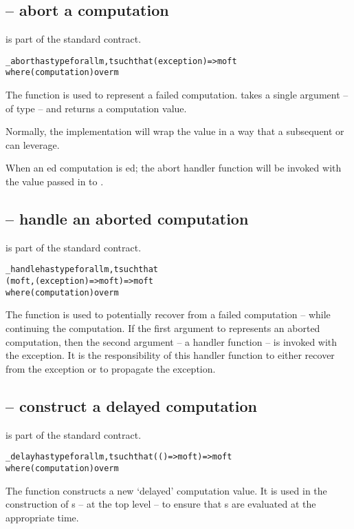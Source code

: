 \subsection{ -- abort a computation}
\label{abortFunction}
 is part of the standard  contract.
\begin{alltt}
\_abort has type for all m,t such that (exception)=>m of t
                 where (computation) over m
\end{alltt}

The  function is used to represent a failed computation.  takes a single argument -- of type  -- and returns a computation value.

\begin{aside}
Normally, the  implementation will wrap the  value in a way that a subsequent  or  can leverage.
\end{aside}

When an ed computation is ed; the abort handler function will be  invoked with the value passed in to .

\subsection{ -- handle an aborted computation}
\label{handleFunction}
 is part of the standard  contract.
\begin{alltt}
\_handle has type for all m,t such that 
                  (m of t, (exception)=>m of t) => m of t
                  where (computation) over m
\end{alltt}

The  function is used to potentially recover from a failed computation -- while continuing the computation. If the first argument to  represents an aborted computation, then the second argument -- a handler function -- is invoked with the exception. It is the responsibility of this handler function to either recover from the exception or to propagate the exception.

\subsection{ -- construct a delayed computation}
\label{delayFunction}
 is part of the standard  contract.
\begin{alltt}
\_delay has type for all m,t such that (()=>m of t)=>m of t
                 where (computation) over m
\end{alltt}
The  function constructs a new `delayed' computation value. It is used in the construction of s -- at the top level -- to ensure that s are evaluated at the appropriate time.

